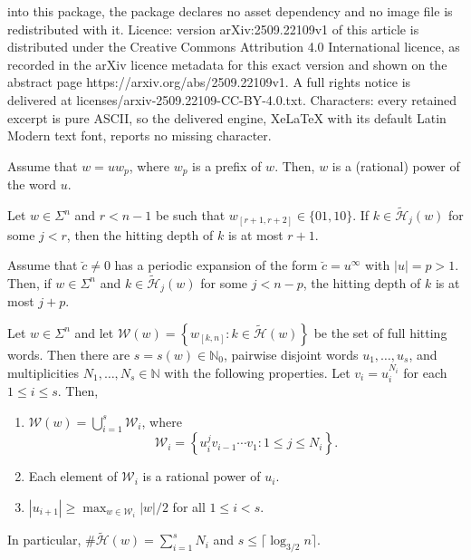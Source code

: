 \documentclass[10pt,a4paper]{amsart}
\newcommand{\N}{{\mathbb N}}
\newcommand{\mc}{\mathcal}
\begin{document}
into this package, the package declares no asset dependency and no image file is redistributed with it. Licence: version arXiv:2509.22109v1 of this article is distributed under the Creative Commons Attribution 4.0 International licence, as recorded in the arXiv licence metadata for this exact version and shown on the abstract page https://arxiv.org/abs/2509.22109v1. A full rights notice is delivered at licenses/arxiv-2509.22109-CC-BY-4.0.txt. Characters: every retained excerpt is pure ASCII, so the delivered engine, XeLaTeX with its default Latin Modern text font, reports no missing character.
\begin{lemma}
\label{LEM:word-power}
Assume that $w = u w_p$, where $w_p$ is a prefix of $w$. Then, $w$ is a (rational) power of the word $u$.
\end{lemma}

\begin{lemma}
\label{LEM:hitting-depths-relations}
Let $w \in \Sigma^n$ and $r<n-1$ be such that $w_{[r+1,r+2]} \in \{01,10 \}$. If $k \in \widetilde{\mc H}_j(w)$ for some $j < r $, then the hitting depth of $k$ is at most $r+1$.
\end{lemma}

\begin{lemma}
\label{LEM:periodic-hitting-depth}
Assume that $\breve{c} \neq 0$ has a periodic expansion of the form $\breve{c} = u^\infty$ with $|u| = p > 1$. Then, if $w \in \Sigma^n$ and $k \in \widetilde{\mc H}_j(w)$ for some $j < n-p$, the hitting depth of $k$ is at most $j+p$.
\end{lemma}

\begin{lemma}
\label{LEM:hitting-word-structure}
Let $w \in \Sigma^n$ and let $\mc W(w) = \left\{ w_{[k,n]} : k \in \widetilde{\mc H}(w) \right\}$ be the set of full hitting words. Then there are $s = s(w) \in \N_0$, pairwise disjoint words $u_1, \ldots, u_s$, and multiplicities 
$N_1, \ldots, N_s \in \N$ with the following properties. Let $v_i = u_i^{N_i}$ for each $1\leqslant i \leqslant s$. Then,

\begin{enumerate}
\item\label{en: 1} $\mc W(w) = \bigcup_{i=1}^s \mc W_i$, where
\[
\mc W_i = \left\{ u_i^j v_{i-1} \cdots v_1: 1 \leqslant j \leqslant N_{i} \right\}.
\]
\item\label{en: 2} Each element of $\mc W_i$ is a rational power of $u_i$.
\item\label{en: 3} $|u_{i+1}| \geqslant \max_{w \in \mc W_i}|w|/2$ for all $1\leqslant i < s$.
\end{enumerate}
In particular, $\# \widetilde{\mc H}(w) = \sum_{i=1}^s N_i$ and $s \leqslant \lceil \log_{3/2} n \rceil$.
\end{lemma}
\end{document}
